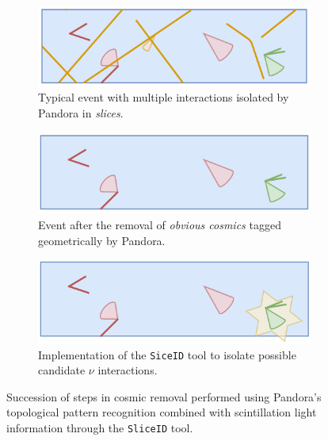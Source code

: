 \begin{figure}[ht] 
\begin{center}
    \begin{subfigure}[b]{0.7\textwidth}
    \centering
    \includegraphics[width=1.00\textwidth]{NuId-Ch2/Images/slice00.png}
    \caption{\label{fig:slcieid:00} Typical event with multiple interactions isolated by Pandora in \emph{slices}.}
    \end{subfigure}
    \begin{subfigure}[b]{0.7\textwidth}
    \centering
    \includegraphics[width=1.00\textwidth]{NuId-Ch2/Images/slice01.png}
    \caption{\label{fig:slcieid:01} Event after the removal of \emph{obvious cosmics} tagged geometrically by Pandora.}
    \end{subfigure}
    \begin{subfigure}[b]{0.7\textwidth}
    \centering
    \includegraphics[width=1.00\textwidth]{NuId-Ch2/Images/slice02.png}
    \caption{\label{fig:slcieid:02} Implementation of the \texttt{SiceID} tool to isolate possible candidate $\nu$ interactions.}
    \end{subfigure}
\caption{\label{fig:sliceid} Succession of steps in cosmic removal performed using Pandora's topological pattern recognition combined with scintillation light information through the \texttt{SliceID} tool.}
\end{center}
\end{figure}

